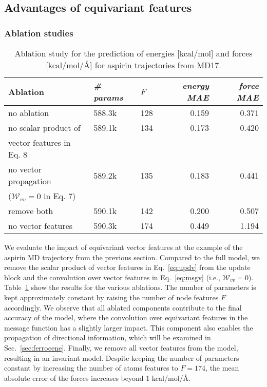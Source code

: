\documentclass[reprint,
amsmath,amssymb,
 aip,jcp
]{revtex4-2}
\newcommand{\new}[1]{#1}
\begin{document}
\subsection{Advantages of equivariant features}
\subsubsection{Ablation studies}
\begin{table}
\begin{center}
\begin{scriptsize}
\caption{Ablation study for the prediction of energies [kcal/mol] and forces [kcal/mol/{\AA}] for aspirin trajectories from MD17.\label{tab:abl}}
\begin{tabular}{lllrr} \toprule
\textbf{Ablation}    & \textbf{\textit{\# params}} & \textbf{$F$} & \textbf{\textit{energy MAE}} & \textbf{\textit{force MAE}} \\ \midrule
no ablation & 588.3k & 128 & 0.159 & 0.371 \\ \midrule
no scalar product of & 589.1k & 134 & 0.173 & 0.420 \\
vector features in Eq. 8 \\
no vector propagation   & 589.2k & 135 & 0.183 & 0.441 \\
($\mathcal{W}_{vv} = 0$ in Eq. 7) \\
remove both & 590.1k & 142  & 0.200 & 0.507 \\  \midrule
no vector features & 590.3k & 174 & 0.449 & 1.194 \\ 
\bottomrule
\end{tabular}
\end{scriptsize}
\end{center}
\end{table}
\new{We evaluate the impact of equivariant vector features at the example of the aspirin MD trajectory from the previous section.
Compared to the full model, we remove the scalar product of vector features in Eq.~\ref{eq:updv} from the update block and the convolution over vector features in Eq.~\ref{eq:msgv} (i.e., $\mathcal{W}_{vv} = 0$).
Table~\ref{tab:abl} show the results for the various ablations.
The number of parameters is kept approximately constant by raising the number of node features $F$ accordingly.
We observe that all ablated components contribute to the final accuracy of the model, where the convolution over equivariant features in the message function has a slightly larger impact.
This component also enables the propagation of directional information, which will be examined in Sec.~\ref{sec:ferrocene}.
Finally, we remove all vector features from the model, resulting in an invariant model.
Despite keeping the number of parameters constant by increasing the number of atoms features to $F=174$, the mean absolute error of the forces increases beyond 1 kcal/mol/{\AA}.
}
\end{document}
